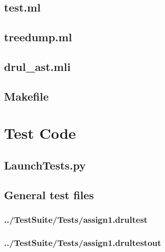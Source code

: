 \begin{changemargin}{-1in}{-1in}
\subsection{test.ml}


\subsection{treedump.ml}


\subsection{drul\_ast.mli}


\subsection{Makefile}


\section{Test Code}
\subsection{LaunchTests.py}


\subsection{General test files}
\subsubsection{../TestSuite/Tests/assign1.drultest}


\subsubsection{../TestSuite/Tests/assign1.drultestout}



\end{changemargin}
